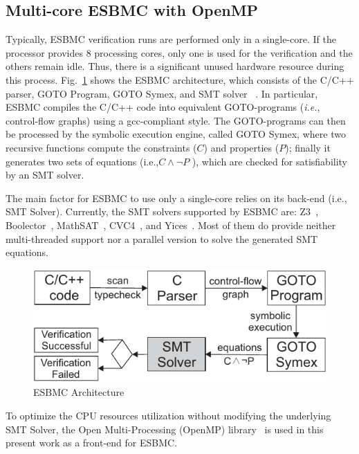 \subsection{Multi-core ESBMC with OpenMP}
\label{Multi-core-ESBMC-with-OpenMP}

Typically, ESBMC verification runs are performed only in a single-core. If the processor provides $8$ processing cores, only one is used for the verification and the others remain idle. Thus, there is a significant unused hardware resource during this process. 
Fig.~\ref{ESBMC-Architecture} shows the ESBMC architecture, which consists of the C/C++ parser, GOTO Program, GOTO Symex, and SMT solver ~\cite{Ramalho2013}. In particular, ESBMC compiles the C/C++ code into equivalent GOTO\hyp{}programs ({\it i.e.}, control-flow graphs) using a gcc-compliant style. The GOTO-programs can then be processed by the symbolic execution engine, called GOTO Symex, where two recursive functions compute the constraints ($C$) and properties ($P$); finally it generates two sets of equations (i.e.,\:$C \land \neg P$ ), which are checked for satisfiability by an SMT solver. 

The main factor for ESBMC to use only a single-core relies on its back-end (i.e., SMT Solver). Currently, the SMT solvers supported by ESBMC are: Z3~\cite{DeMoura2008}, Boolector~\cite{Brummayer2009}, MathSAT~\cite{Barrett2011}, CVC4~\cite{Bozzano2005}, and Yices~\cite{Dutertre2014}. Most of them do provide neither multi-threaded support nor a parallel version to solve the generated SMT equations.
\begin{figure}[ht]
	\centering
  \includegraphics[scale=0.9]{Image/esbmc-arch-new.pdf} 
	\caption{ESBMC Architecture}
	\label{ESBMC-Architecture}
\end{figure}

To optimize the CPU resources utilization without modifying the underlying SMT Solver, the Open Multi-Processing (OpenMP) library~\cite{Dagum1998} is used in this present work as a front-end for ESBMC.

